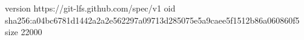 version https://git-lfs.github.com/spec/v1
oid sha256:a04bc6781d1442a2a2e562297a09713d285075e5a9caee5f1512b86a060860f5
size 22000
